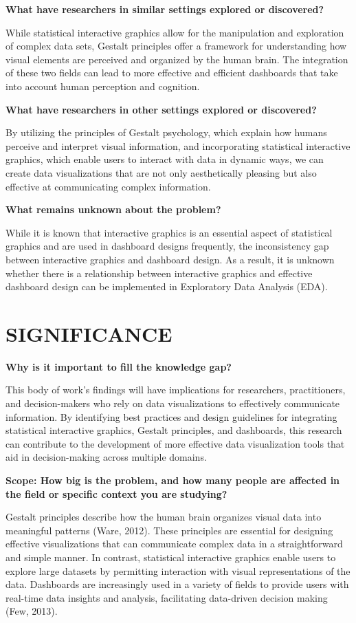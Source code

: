 \documentclass[print]{nuthesis}
\begin{document}
\textbf{What have researchers in similar settings explored or discovered?}

While statistical interactive graphics allow for the manipulation and exploration of complex data sets, Gestalt principles offer a framework for understanding how visual elements are perceived and organized by the human brain.
The integration of these two fields can lead to more effective and efficient dashboards that take into account human perception and cognition.

\textbf{What have researchers in other settings explored or discovered?}

By utilizing the principles of Gestalt psychology, which explain how humans perceive and interpret visual information, and incorporating statistical interactive graphics, which enable users to interact with data in dynamic ways, we can create data visualizations that are not only aesthetically pleasing but also effective at communicating complex information.

\textbf{What remains unknown about the problem?}

While it is known that interactive graphics is an essential aspect of statistical graphics and are used in dashboard designs frequently, the inconsistency gap between interactive graphics and dashboard design.
As a result, it is unknown whether there is a relationship between interactive graphics and effective dashboard design can be implemented in Exploratory Data Analysis (EDA).

\hypertarget{significance}{%
\chapter{SIGNIFICANCE}\label{significance}}

\textbf{Why is it important to fill the knowledge gap?}

This body of work's findings will have implications for researchers, practitioners, and decision-makers who rely on data visualizations to effectively communicate information.
By identifying best practices and design guidelines for integrating statistical interactive graphics, Gestalt principles, and dashboards, this research can contribute to the development of more effective data visualization tools that aid in decision-making across multiple domains.

\textbf{Scope: How big is the problem, and how many people are affected in the field or specific context you are studying?}

Gestalt principles describe how the human brain organizes visual data into meaningful patterns (Ware, 2012).
These principles are essential for designing effective visualizations that can communicate complex data in a straightforward and simple manner.
In contrast, statistical interactive graphics enable users to explore large datasets by permitting interaction with visual representations of the data.
Dashboards are increasingly used in a variety of fields to provide users with real-time data insights and analysis, facilitating data-driven decision making (Few, 2013).
\end{document}

